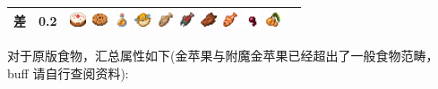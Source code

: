 \begin{table}[H]
\begin{tabular}{c|c|cc}
        差 & 0.2 & \includegraphics[width=0.5cm,height=0.5cm]{./images/origin/cake.png} \includegraphics[width=0.5cm,height=0.5cm]{./images/origin/cookie.png} \includegraphics[width=0.5cm,height=0.5cm]{./images/origin/honey_bottle.png} \includegraphics[width=0.5cm,height=0.5cm]{./images/origin/pufferfish.png} \includegraphics[width=0.5cm,height=0.5cm]{./images/origin/cod.png} \includegraphics[width=0.5cm,height=0.5cm]{./images/origin/salmon.png} \includegraphics[width=0.5cm,height=0.5cm]{./images/origin/rotten_flesh.png} \includegraphics[width=0.5cm,height=0.5cm]{./images/origin/tropical_fish.png} \includegraphics[width=0.5cm,height=0.5cm]{./images/origin/spider_eye.png} \includegraphics[width=0.5cm,height=0.5cm]{./images/origin/glow_berries.png} \\
        \bottomrule
    \end{tabular}
\end{table}

对于原版食物，汇总属性如下(金苹果与附魔金苹果已经超出了一般食物范畴，buff 请自行查阅资料):



